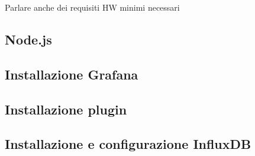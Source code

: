 Parlare anche dei requisiti HW minimi necessari
\subsection{Node.js}
\subsection{Installazione Grafana}
\subsection{Installazione plugin}
\subsection{Installazione e configurazione InfluxDB}